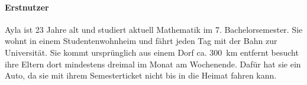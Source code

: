 \paragraph{Erstnutzer} Ayla ist 23 Jahre alt und studiert aktuell Mathematik im 7. Bachelorsemester. Sie wohnt in einem Studentenwohnheim und fährt jeden Tag mit der Bahn zur Universität. Sie kommt ursprünglich aus einem Dorf ca. 300~km entfernt besucht ihre Eltern dort mindestens dreimal im Monat am Wochenende. Dafür hat sie ein Auto, da sie mit ihrem Semesterticket nicht bis in die Heimat fahren kann.


